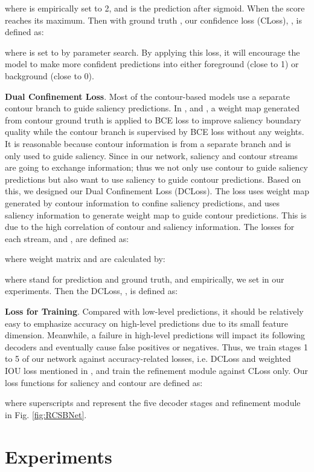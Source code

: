 \documentclass[10pt,twocolumn,letterpaper]{article}
\begin{document}
where  is empirically set to 2, and  is the prediction after sigmoid. When  the score reaches its maximum. Then with ground truth , our confidence loss (CLoss), , is defined as:

where  is set to  by parameter search. By applying this loss, it will encourage the model to make more confident predictions into either foreground (close to 1) or background (close to 0). 

\textbf{Dual Confinement Loss}.
Most of the contour-based models use a separate contour branch to guide saliency predictions. In \cite{CTLoss}, and \cite{ITSD}, a weight map generated from contour ground truth is applied to BCE loss to improve saliency boundary quality while the contour branch is supervised by BCE loss without any weights. It is reasonable because contour information is from a separate branch and is only used to guide saliency. Since in our network, saliency and contour streams are going to exchange information; thus we not only use contour to guide saliency predictions but also want to use saliency to guide contour predictions. Based on this, we designed our Dual Confinement Loss (DCLoss). The loss uses weight map generated by contour information to confine saliency predictions, and uses saliency information to generate weight map to guide contour predictions. This is due to the high correlation of contour and saliency information. The losses for each stream,  and , are defined as:


where weight matrix  and  are calculated by:


where  stand for prediction and ground truth, and empirically, we set  in our experiments.
Then the DCLoss, , is defined as:

\textbf{Loss for Training}.
Compared with low-level predictions, it should be relatively easy to emphasize accuracy on high-level predictions due to its small feature dimension. Meanwhile, a failure in high-level predictions will impact its following decoders and eventually cause false positives or negatives. Thus, we train stages 1 to 5 of our network against accuracy-related losses, i.e. DCLoss and weighted IOU loss mentioned in \cite{F3NET}, and train the refinement module against CLoss only. Our loss functions for saliency and contour are defined as:


where superscripts  and  represent the five decoder stages and refinement module in Fig. \ref{fig:RCSBNet}.


\section{Experiments}
\label{Experiments}
\end{document}
